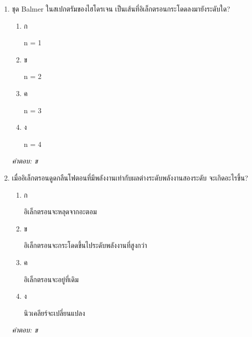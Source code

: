 \documentclass[12pt]{article}
\begin{document}
\begin{enumerate}[label=\arabic*., itemsep=0.5\baselineskip, topsep=0.5\baselineskip, leftmargin=*]
\item ชุด Balmer ในสเปกตรัมของไฮโดรเจน เป็นเส้นที่อิเล็กตรอนกระโดดลงมายังระดับใด?
\begin{enumerate}[label=\alph*)., itemsep=0.3\baselineskip, topsep=0.3\baselineskip]
\item ก\ 
\begin{minipage}[t]{0.9\linewidth}
\raggedright n = 1
\end{minipage}
\item ข\ 
\begin{minipage}[t]{0.9\linewidth}
\raggedright n = 2
\end{minipage}
\item ค\ 
\begin{minipage}[t]{0.9\linewidth}
\raggedright n = 3
\end{minipage}
\item ง\ 
\begin{minipage}[t]{0.9\linewidth}
\raggedright n = 4
\end{minipage}
\end{enumerate}
\vspace{-0.3\baselineskip}
\begin{small}
\textit{คำตอบ: ข}
\end{small}

\item เมื่ออิเล็กตรอนดูดกลืนโฟตอนที่มีพลังงานเท่ากับผลต่างระดับพลังงานสองระดับ จะเกิดอะไรขึ้น?
\begin{enumerate}[label=\alph*)., itemsep=0.3\baselineskip, topsep=0.3\baselineskip]
\item ก\ 
\begin{minipage}[t]{0.9\linewidth}
\raggedright อิเล็กตรอนจะหลุดจากอะตอม
\end{minipage}
\item ข\ 
\begin{minipage}[t]{0.9\linewidth}
\raggedright อิเล็กตรอนจะกระโดดขึ้นไประดับพลังงานที่สูงกว่า
\end{minipage}
\item ค\ 
\begin{minipage}[t]{0.9\linewidth}
\raggedright อิเล็กตรอนจะอยู่ที่เดิม
\end{minipage}
\item ง\ 
\begin{minipage}[t]{0.9\linewidth}
\raggedright นิวเคลียร์จะเปลี่ยนแปลง
\end{minipage}
\end{enumerate}
\vspace{-0.3\baselineskip}
\begin{small}
\textit{คำตอบ: ข}
\end{small}


\end{enumerate}
\end{document}
